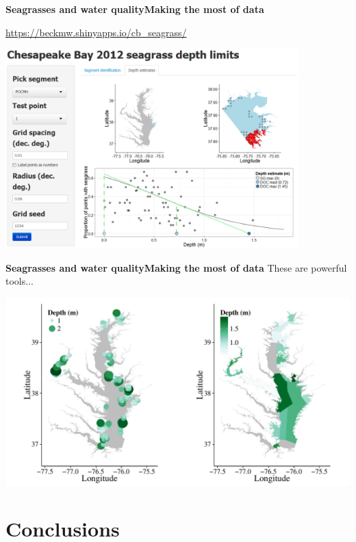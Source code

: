 \documentclass[serif]{beamer}\usepackage[]{graphicx}\usepackage[]{color}
\begin{document}
\begin{frame}{\textbf{Seagrasses and water quality}}{\textbf{Making the most of data}}
\centerline{\href{https://beckmw.shinyapps.io/cb_seagrass/}{https://beckmw.shinyapps.io/cb\_seagrass/}}
\centerline{\includegraphics[width = 0.85\textwidth]{fig/widget_cb.png}}
\end{frame}

\begin{frame}{\textbf{Seagrasses and water quality}}{\textbf{Making the most of data}}
These are powerful tools...


{\centering \includegraphics[width=\textwidth]{fig/cb_all} 

}



\end{frame}

\section{Conclusions}
\end{document}

